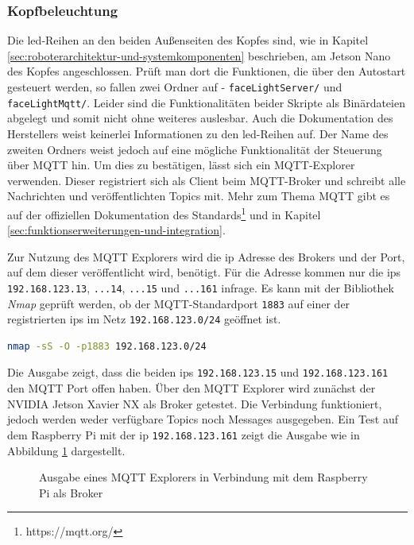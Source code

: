 \subsubsection{Kopfbeleuchtung}
\label{subsubsec:led}

Die \gls{led}-Reihen an den beiden Außenseiten des Kopfes sind, wie in Kapitel \ref{sec:roboterarchitektur-und-systemkomponenten}
beschrieben, am Jetson Nano des Kopfes angeschlossen.
Prüft man dort die Funktionen, die über den Autostart gesteuert werden, so fallen zwei Ordner auf - \texttt{faceLightServer/}
und \texttt{faceLightMqtt/}.
Leider sind die Funktionalitäten beider Skripte als Binärdateien abgelegt und somit nicht ohne weiteres auslesbar.
Auch die Dokumentation des Herstellers weist keinerlei Informationen zu den \gls{led}-Reihen auf.
Der Name des zweiten Ordners weist jedoch auf eine mögliche Funktionalität der Steuerung über MQTT hin.
Um dies zu bestätigen, lässt sich ein MQTT-Explorer verwenden.
Dieser registriert sich als Client beim MQTT-Broker und schreibt alle Nachrichten und veröffentlichten Topics mit.
Mehr zum Thema MQTT gibt es auf der offiziellen Dokumentation des Standards\footnote{https://mqtt.org/} und in Kapitel \ref{sec:funktionserweiterungen-und-integration}.

Zur Nutzung des MQTT Explorers wird die \gls{ip} Adresse des Brokers und der Port, auf dem dieser veröffentlicht wird, benötigt.
Für die Adresse kommen nur die \glspl{ip} \texttt{192.168.123.13}, \texttt{...14}, \texttt{...15} und \texttt{...161}
infrage.
Es kann mit der Bibliothek \emph{Nmap} geprüft werden, ob der MQTT-Standardport \texttt{1883} auf einer der registrierten \glspl{ip}
im Netz \texttt{192.168.123.0/24} geöffnet ist.

\begin{lstlisting}[language=Bash]
nmap -sS -O -p1883 192.168.123.0/24
\end{lstlisting}

\noindent Die Ausgabe zeigt, dass die beiden \glspl{ip}
\texttt{192\allowbreak .168\allowbreak .123\allowbreak .15} und \texttt{192\allowbreak .168\allowbreak .123\allowbreak .161} den MQTT Port offen haben.
Über den MQTT Explorer wird zunächst der NVIDIA Jetson Xavier NX als Broker getestet.
Die Verbindung funktioniert, jedoch werden weder verfügbare Topics noch Messages ausgegeben.
Ein Test auf dem Raspberry Pi mit der \gls{ip} \texttt{192.168.123.161} zeigt die Ausgabe wie in Abbildung \ref{fig:mqtt-explorer}
dargestellt.

\begin{figure}[h]
    \caption{Ausgabe eines MQTT Explorers in Verbindung mit dem Raspberry Pi als Broker}\label{fig:mqtt-explorer}
\end{figure}

